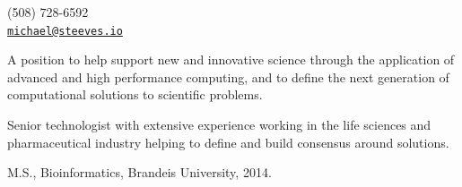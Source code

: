 \documentclass[11pt,article,oneside]{memoir}
\makeatletter
\def\myemail{michael@steeves.io}
\def\myweb{http://steeves.io}
\def\myphone{(508) 728-6592}
\def\mytwitter{@steevmi1}
\makeatother
\begin{document}
\begin{minipage}[t]{2.95in}

\end{minipage}
\hfill
\hfill
\begin{minipage}[t]{1.3in}
  \flushright \footnotesize  \addressblock \myphone \, \faPhone \\
  {\scriptsize  \texttt{\href{mailto:\myemail}{\myemail}} \, \faEnvelope} \\
\end{minipage}

\medskip

\reversemarginpar

\bigskip


{}

\ind A position to help support new and innovative science through the application of advanced and high performance computing, and to define the next generation of computational solutions to scientific problems.

\bigskip


\ind Senior technologist with extensive experience working in the life sciences and pharmaceutical industry helping to define and build consensus around solutions.

\bigskip




\ind M.S., Bioinformatics, Brandeis University, 2014.
\end{document}
